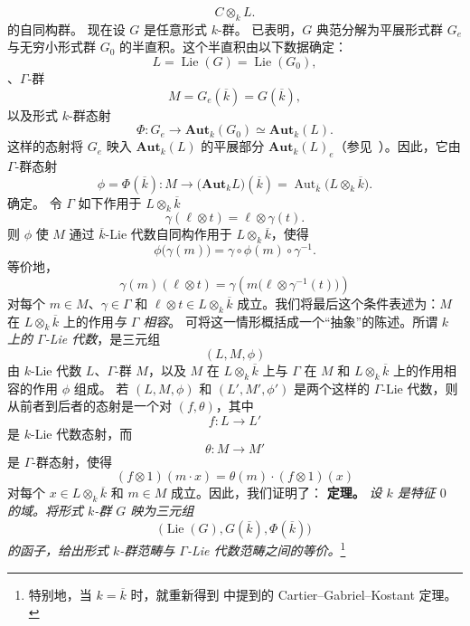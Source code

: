 \[
  C\otimes_k L.
\]
的自同构群。
现在设 \(G\) 是任意形式 \(k\)-群。 已表明，\(G\) 典范分解为平展形式群 \(G_e\) 与无穷小形式群 \(G_0\) 的半直积。这个半直积由以下数据确定：
\[
  L=\operatorname{Lie}(G)=\operatorname{Lie}(G_0),
\]
、\(\Gamma\)-群
\[
  M=G_e(\overline k)=G(\overline k),
\]
以及形式 \(k\)-群态射
\[
  \Phi:
  G_e\longrightarrow
  \mathbf{Aut}_k(G_0)
  \simeq
  \mathbf{Aut}_k(L).
\]
这样的态射将 \(G_e\) 映入 \(\mathbf{Aut}_k(L)\) 的平展部分 \(\mathbf{Aut}_k(L)_e\)\textup{（参见\ ）}。因此，它由 \(\Gamma\)-群态射
\[
  \phi=\Phi(\overline k):
  M\longrightarrow
  \bigl(\mathbf{Aut}_kL\bigr)(\overline k)
  =
  \operatorname{Aut}_{\overline k}
    \bigl(L\otimes_k\overline k\bigr).
\]
确定。
令 \(\Gamma\) 如下作用于 \(L\otimes_k\overline k\)
\[
  \gamma(\ell\otimes t)=\ell\otimes\gamma(t).
\]
则 \(\phi\) 使 \(M\) 通过 \(\overline k\)-Lie 代数自同构作用于 \(L\otimes_k\overline k\)，使得
\[
  \phi\bigl(\gamma(m)\bigr)
  =
  \gamma\circ\phi(m)\circ\gamma^{-1}.
\]
等价地，
\[
  \gamma(m)(\ell\otimes t)
  =
  \gamma\!\left(
    m\bigl(\ell\otimes\gamma^{-1}(t)\bigr)
  \right)
\]
对每个 \(m\in M\)、\(\gamma\in\Gamma\) 和 \(\ell\otimes t\in L\otimes_k\overline k\) 成立。我们将最后这个条件表述为：\(M\) 在 \(L\otimes_k\overline k\) 上的作用\emph{与 \(\Gamma\) 相容}。
可将这一情形概括成一个“抽象”的陈述。所谓 \emph{\(k\) 上的 \(\Gamma\)-Lie 代数}，是三元组
\[
  (L,M,\phi)
\]
由 \(k\)-Lie 代数 \(L\)、\(\Gamma\)-群 \(M\)，以及 \(M\) 在 \(L\otimes_k\overline k\) 上与 \(\Gamma\) 在 \(M\) 和 \(L\otimes_k\overline k\) 上的作用相容的作用 \(\phi\) 组成。
若 \((L,M,\phi)\) 和 \((L',M',\phi')\) 是两个这样的 \(\Gamma\)-Lie 代数，则从前者到后者的态射是一个对 \((f,\theta)\)，其中
\[
  f:L\longrightarrow L'
\]
是 \(k\)-Lie 代数态射，而
\[
  \theta:M\longrightarrow M'
\]
是 \(\Gamma\)-群态射，使得
\[
  (f\otimes1)(m\cdot x)
  =
  \theta(m)\cdot(f\otimes1)(x)
\]
对每个 \(x\in L\otimes_k\overline k\) 和 \(m\in M\) 成立。因此，我们证明了：
\medskip
\noindent\textbf{定理。}
\label{sga3:VIIB:3.3.3:gamma-lie-equivalence}
{\itshape 设 \(k\) 是特征 \(0\) 的域。将形式 \(k\)-群 \(G\) 映为三元组
\[
  \bigl(
    \operatorname{Lie}(G),
    G(\overline k),
    \Phi(\overline k)
  \bigr)
\]
的函子，给出形式 \(k\)-群范畴与 \(\Gamma\)-Lie 代数范畴之间的等价。}\footnote{%
\label{sga3:VIIB:nde:133}特别地，当 \(k=\overline k\) 时，就重新得到  中提到的 Cartier--Gabriel--Kostant 定理。}
